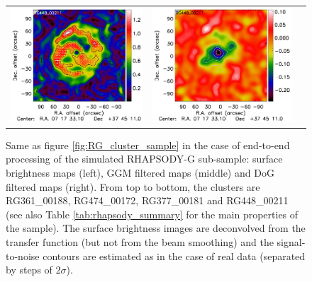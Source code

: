 \documentclass[twocolumn,traditabstract]{aa}
\begin{document}
\begin{figure}[h]
{\begin{tabular}{lll}
\includegraphics[trim=2.3cm 0.7cm 0cm 0cm, clip=true, scale=1]{Figure/Grad_RG448_00211_Ymap_zobs0p4_processed_15_15_45.pdf} & 
\includegraphics[trim=2.3cm 0.7cm 0cm 0cm, clip=true, scale=1]{Figure/DoG_RG448_00211_Ymap_zobs0p4_processed_15_15_45.pdf} \\
\end{tabular}}
\caption{\footnotesize{Same as figure \ref{fig:RG_cluster_sample} in the case of end-to-end processing of the simulated RHAPSODY-G sub-sample: surface brightness maps (left), GGM filtered maps (middle) and DoG filtered maps (right). From top to bottom, the clusters are RG361\_00188, RG474\_00172, RG377\_00181 and RG448\_00211 (see also Table \ref{tab:rhapsody_summary} for the main properties of the sample). The surface brightness images are deconvolved from the transfer function (but not from the beam smoothing) and the signal-to-noise contours are estimated as in the case of real data (separated by steps of $2 \sigma$).}}
\label{fig:RG_cluster_sample_proc}
\end{figure}
\end{document}
